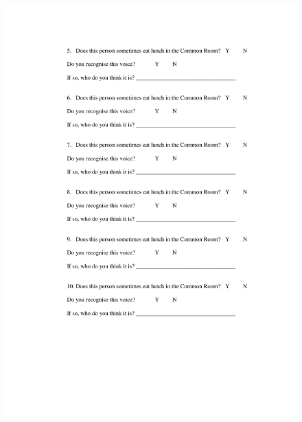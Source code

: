 \begin{figure}
	\centering
		\includegraphics[width=5in]{images/Exp3page2.pdf}
		\label{x3p2}
\end{figure}

